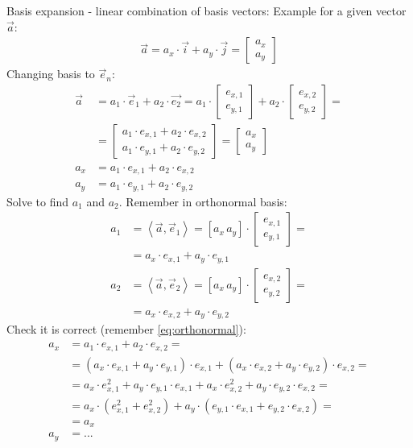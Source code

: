 \documentclass{article}
\begin{document}
Basis expansion - linear combination of basis vectors:
Example for a given vector $\vec{a}$:
\begin{align*}
    \vec{a}  = a_x \cdot \vec{i} + a_y \cdot \vec{j} = \begin{bmatrix}  a_x \\ a_y\end{bmatrix}
\end{align*}
Changing basis to $\vec{e}_n$:
\begin{align*}
    \vec{a}  &= a_1 \cdot \vec{e}_1 + a_2 \cdot \vec{e_2} = a_1 \cdot  \begin{bmatrix}  e_{x,1} \\ e_{y,1}\end{bmatrix}  + a_2 \cdot  \begin{bmatrix}  e_{x,2} \\ e_{y,2}\end{bmatrix} = \\
    &=  \begin{bmatrix}  a_1 \cdot e_{x,1} + a_2 \cdot e_{x,2} \\  a_1 \cdot e_{y,1} + a_2 \cdot e_{y,2}\end{bmatrix} = \begin{bmatrix}  a_x \\ a_y\end{bmatrix}\\
    a_x &= a_1 \cdot e_{x,1} + a_2 \cdot e_{x,2} \\
    a_y &= a_1 \cdot e_{y,1} + a_2 \cdot e_{y,2} 
\end{align*}
Solve to find $a_1$ and $a_2$. Remember in orthonormal basis:
\begin{align*}
    a_1 &= \left< \vec{a}, \vec{e}_1 \right> = \left[ a_x \, a_y \right] \cdot \begin{bmatrix}  e_{x,1} \\ e_{y,1}\end{bmatrix} = \\
     &= a_x \cdot e_{x,1} + a_y \cdot e_{y,1} \\
    a_2 &= \left< \vec{a}, \vec{e}_2 \right> = \left[ a_x \, a_y \right] \cdot \begin{bmatrix}  e_{x,2} \\ e_{y,2}\end{bmatrix} = \\
     &= a_x \cdot e_{x,2} + a_y \cdot e_{y,2}
\end{align*}
Check it is correct (remember \ref{eq:orthonormal}):
\begin{align*}
    a_x &= a_1 \cdot e_{x,1} + a_2 \cdot e_{x,2} = \\
    &= (a_x \cdot e_{x,1} + a_y \cdot e_{y,1})  \cdot e_{x,1} + (a_x \cdot e_{x,2} + a_y \cdot e_{y,2})   \cdot e_{x,2}  = \\
    &= a_x \cdot e_{x,1}^2 + a_y \cdot e_{y,1}  \cdot e_{x,1} + a_x \cdot e_{x,2}^2 + a_y \cdot e_{y,2}   \cdot e_{x,2} = \\
    &= a_x \cdot (e_{x,1}^2 + e_{x,2}^2)  + a_y \cdot  (e_{y,1}  \cdot e_{x,1} + e_{y,2}   \cdot e_{x,2}) = \\
    &= a_x \\
    a_y &= ... \\
\end{align*}
\end{document}
